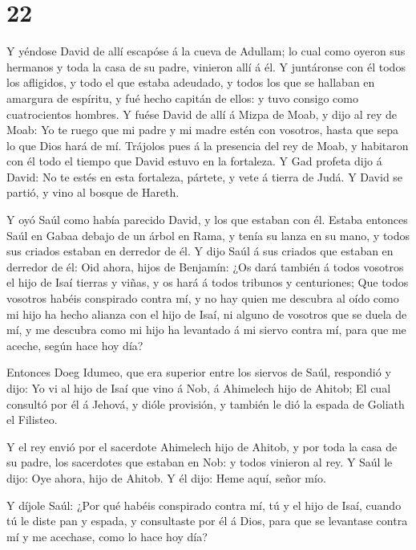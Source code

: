 \hypertarget{section-21}{%
\section{22}\label{section-21}}

 Y yéndose David de allí escapóse á la cueva de Adullam; lo
cual como oyeron sus hermanos y toda la casa de su padre, vinieron allí
á él.  Y juntáronse con él todos los afligidos, y todo el
que estaba adeudado, y todos los que se hallaban en amargura de
espíritu, y fué hecho capitán de ellos: y tuvo consigo como
cuatrocientos hombres.  Y fuése David de allí á Mizpa de
Moab, y dijo al rey de Moab: Yo te ruego que mi padre y mi madre estén
con vosotros, hasta que sepa lo que Dios hará de mí. 
Trájolos pues á la presencia del rey de Moab, y habitaron con él todo el
tiempo que David estuvo en la fortaleza.  Y Gad profeta dijo
á David: No te estés en esta fortaleza, pártete, y vete á tierra de
Judá. Y David se partió, y vino al bosque de Hareth.

 Y oyó Saúl como había parecido David, y los que estaban con
él. Estaba entonces Saúl en Gabaa debajo de un árbol en Rama, y tenía su
lanza en su mano, y todos sus criados estaban en derredor de él.
 Y dijo Saúl á sus criados que estaban en derredor de él:
Oid ahora, hijos de Benjamín: ¿Os dará también á todos vosotros el hijo
de Isaí tierras y viñas, y os hará á todos tribunos y centuriones;
 Que todos vosotros habéis conspirado contra mí, y no hay
quien me descubra al oído como mi hijo ha hecho alianza con el hijo de
Isaí, ni alguno de vosotros que se duela de mí, y me descubra como mi
hijo ha levantado á mi siervo contra mí, para que me aceche, según hace
hoy día?

 Entonces Doeg Idumeo, que era superior entre los siervos de
Saúl, respondió y dijo: Yo vi al hijo de Isaí que vino á Nob, á
Ahimelech hijo de Ahitob;  El cual consultó por él á
Jehová, y dióle provisión, y también le dió la espada de Goliath el
Filisteo.

 Y el rey envió por el sacerdote Ahimelech hijo de Ahitob,
y por toda la casa de su padre, los sacerdotes que estaban en Nob: y
todos vinieron al rey.  Y Saúl le dijo: Oye ahora, hijo de
Ahitob. Y él dijo: Heme aquí, señor mío.

 Y díjole Saúl: ¿Por qué habéis conspirado contra mí, tú y
el hijo de Isaí, cuando tú le diste pan y espada, y consultaste por él á
Dios, para que se levantase contra mí y me acechase, como lo hace hoy
día?

